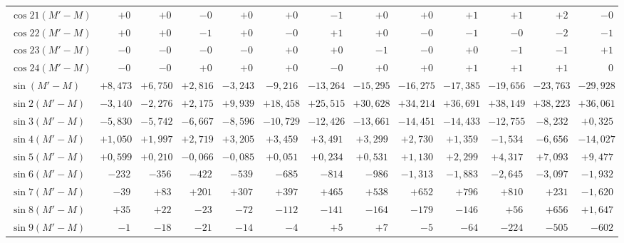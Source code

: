 \begin{landscape}
\begin{longtable}{@{}l|r|r|r|r|r|r|r|r|r|r|r|r@{}}
\(\cos 21(M'-M)\) & \(+0\) & \(+0\) & \(-0\) & \(+0\) & \(+0\) & \(-1\) & \(+0\) & \(+0\) & \(+1\) & \(+1\) & \(+2\) & \(-0\)\\
\(\cos 22(M'-M)\) & \(+0\) & \(+0\) & \(-1\) & \(+0\) & \(-0\) & \(+1\) & \(+0\) & \(-0\) & \(-1\) & \(-0\) & \(-2\) & \(-1\)\\
\(\cos 23(M'-M)\) & \(-0\) & \(-0\) & \(-0\) & \(-0\) & \(+0\) & \(+0\) & \(-1\) & \(-0\) & \(+0\) & \(-1\) & \(-1\) & \(+1\)\\
\(\cos 24(M'-M)\) & \(-0\) & \(-0\) & \(+0\) & \(+0\) & \(+0\) & \(-0\) & \(+0\) & \(+0\) & \(+1\) & \(+1\) & \(+1\) & \(0\)\\[6pt]
\(\sin(M'-M)\) & \(+8{,}473\) & \(+6{,}750\) & \(+2{,}816\) & \(-3{,}243\) & \(-9{,}216\) & \(-13{,}264\) & \(-15{,}295\) & \(-16{,}275\) & \(-17{,}385\) & \(-19{,}656\) & \(-23{,}763\) & \(-29{,}928\)\\
\(\sin 2(M'-M)\) & \(-3{,}140\) & \(-2{,}276\) & \(+2{,}175\) & \(+9{,}939\) & \(+18{,}458\) & \(+25{,}515\) & \(+30{,}628\) & \(+34{,}214\) & \(+36{,}691\) & \(+38{,}149\) & \(+38{,}223\) & \(+36{,}061\)\\
\(\sin 3(M'-M)\) & \(-5{,}830\) & \(-5{,}742\) & \(-6{,}667\) & \(-8{,}596\) & \(-10{,}729\) & \(-12{,}426\) & \(-13{,}661\) & \(-14{,}451\) & \(-14{,}433\) & \(-12{,}755\) & \(-8{,}232\) & \(+0{,}325\)\\
\(\sin 4(M'-M)\) & \(+1{,}050\) & \(+1{,}997\) & \(+2{,}719\) & \(+3{,}205\) & \(+3{,}459\) & \(+3{,}491\) & \(+3{,}299\) & \(+2{,}730\) & \(+1{,}359\) & \(-1{,}534\) & \(-6{,}656\) & \(-14{,}027\)\\
\(\sin 5(M'-M)\) & \(+0{,}599\) & \(+0{,}210\) & \(-0{,}066\) & \(-0{,}085\) & \(+0{,}051\) & \(+0{,}234\) & \(+0{,}531\) & \(+1{,}130\) & \(+2{,}299\) & \(+4{,}317\) & \(+7{,}093\) & \(+9{,}477\)\\
\(\sin 6(M'-M)\) & \(-232\) & \(-356\) & \(-422\) & \(-539\) & \(-685\) & \(-814\) & \(-986\) & \(-1{,}313\) & \(-1{,}883\) & \(-2{,}645\) & \(-3{,}097\) & \(-1{,}932\)\\
\(\sin 7(M'-M)\) & \(-39\) & \(+83\) & \(+201\) & \(+307\) & \(+397\) & \(+465\) & \(+538\) & \(+652\) & \(+796\) & \(+810\) & \(+231\) & \(-1{,}620\)\\
\(\sin 8(M'-M)\) & \(+35\) & \(+22\) & \(-23\) & \(-72\) & \(-112\) & \(-141\) & \(-164\) & \(-179\) & \(-146\) & \(+56\) & \(+656\) & \(+1{,}647\)\\
\(\sin 9(M'-M)\) & \(-1\) & \(-18\) & \(-21\) & \(-14\) & \(-4\) & \(+5\) & \(+7\) & \(-5\) & \(-64\) & \(-224\) & \(-505\) & \(-602\)\\

\end{longtable}
\end{landscape}
